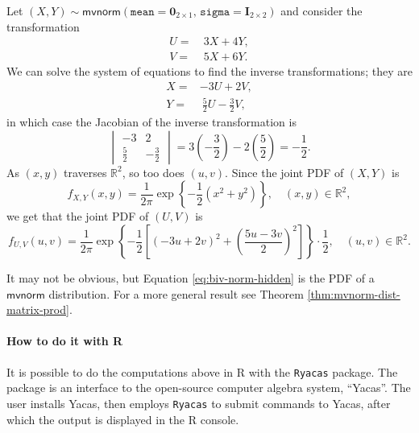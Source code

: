 \documentclass[captions=tableheading]{scrbook}
\begin{document}
\begin{example}
Let \((X,Y)\sim\mathsf{mvnorm}(\mathtt{mean}=\mathbf{0}_{2\times1},\,\mathtt{sigma}=\mathbf{I}_{2\times2})\) and consider the transformation
\begin{align*}
U= & \ 3X+4Y,\\
V= & \ 5X+6Y.
\end{align*}
We can solve the system of equations to find the inverse transformations; they are
\begin{align*}
X= & -3U+2V,\\
Y= & \ \frac{5}{2}U-\frac{3}{2}V,
\end{align*}
in which case the Jacobian of the inverse transformation is
\[
\begin{vmatrix}
-3 & 2\\
\frac{5}{2} & -\frac{3}{2}
\end{vmatrix}
= 3\left(-\frac{3}{2}\right)-2\left(\frac{5}{2}\right) = -\frac{1}{2}.
\]
As \((x,y)\) traverses \(\mathbb{R}^{2}\), so too does \((u,v)\). Since the joint PDF of \((X,Y)\) is
\[
f_{X,Y}(x,y)=\frac{1}{2\pi}\exp\left\{ -\frac{1}{2}\left(x^{2}+y^{2}\right)\right\} ,\quad(x,y)\in\mathbb{R}^{2},
\]
we get that the joint PDF of \((U,V)\) is
\begin{equation}
f_{U,V}(u,v)=\frac{1}{2\pi}\exp\left\{ -\frac{1}{2}\left[\left(-3u+2v\right)^{2}+\left(\frac{5u-3v}{2}\right)^{2}\right]\right\} \cdot\frac{1}{2},\quad(u,v)\in\mathbb{R}^{2}.\label{eq:biv-norm-hidden}
\end{equation}
\end{example}

\begin{rem}
It may not be obvious, but Equation \ref{eq:biv-norm-hidden} is the PDF of a \(\mathsf{mvnorm}\) distribution. For a more general result see Theorem \ref{thm:mvnorm-dist-matrix-prod}.
\end{rem}

\paragraph*{How to do it with \textsf{R}}
\label{sub:bivariate-transf-R}

It is possible to do the computations above in \textsf{R} with the \texttt{Ryacas} package. The package is an interface to the open-source computer algebra system, ``Yacas''. The user installs Yacas, then employs \texttt{Ryacas} to submit commands to Yacas, after which the output is displayed in the \textsf{R} console.
\end{document}
